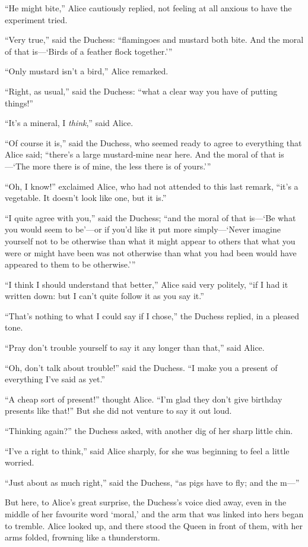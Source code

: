 \documentclass[11pt,openany,oneside]{book}
\begin{document}
“He might bite,” Alice cautiously replied, not feeling at all anxious to have the experiment tried. 

“Very true,” said the Duchess: “flamingoes and mustard both bite. And the moral of that is—‘Birds of a feather flock together.’” 

“Only mustard isn’t a bird,” Alice remarked. 

“Right, as usual,” said the Duchess: “what a clear way you have of putting things!” 

“It’s a mineral, I {\em think\/},” said Alice. 

“Of course it is,” said the Duchess, who seemed ready to agree to everything that Alice said; “there’s a large mustard-mine near here. And the moral of that is—‘The more there is of mine, the less there is of yours.’” 

“Oh, I know!” exclaimed Alice, who had not attended to this last remark, “it’s a vegetable. It doesn’t look like one, but it is.” 

“I quite agree with you,” said the Duchess; “and the moral of that is—‘Be what you would seem to be’—or if you’d like it put more simply—‘Never imagine yourself not to be otherwise than what it might appear to others that what you were or might have been was not otherwise than what you had been would have appeared to them to be otherwise.’” 

“I think I should understand that better,” Alice said very politely, “if I had it written down: but I can’t quite follow it as you say it.” 

“That’s nothing to what I could say if I chose,” the Duchess replied, in a pleased tone. 

“Pray don’t trouble yourself to say it any longer than that,” said Alice. 

“Oh, don’t talk about trouble!” said the Duchess. “I make you a present of everything I’ve said as yet.” 

“A cheap sort of present!” thought Alice. “I’m glad they don’t give birthday presents like that!” But she did not venture to say it out loud. 

“Thinking again?” the Duchess asked, with another dig of her sharp little chin. 

“I’ve a right to think,” said Alice sharply, for she was beginning to feel a little worried. 

“Just about as much right,” said the Duchess, “as pigs have to fly; and the m—” 

But here, to Alice’s great surprise, the Duchess’s voice died away, even in the middle of her favourite word ‘moral,’ and the arm that was linked into hers began to tremble. Alice looked up, and there stood the Queen in front of them, with her arms folded, frowning like a thunderstorm. 
\end{document}
